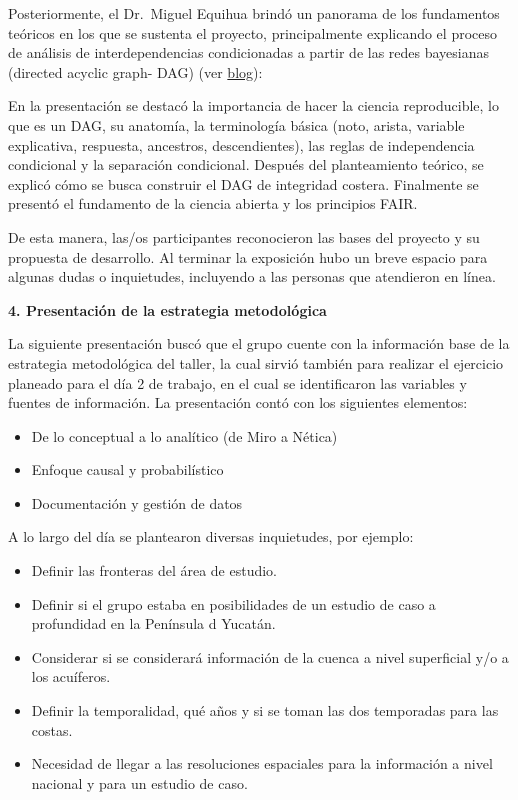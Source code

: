 \documentclass[
  letterpaper,
  DIV=11,
  numbers=noendperiod]{scrreprt}
\begin{document}
Posteriormente, el Dr.~Miguel Equihua brindó un panorama de los
fundamentos teóricos en los que se sustenta el proyecto, principalmente
explicando el proceso de análisis de interdependencias condicionadas a
partir de las redes bayesianas (directed acyclic graph- DAG) (ver
\href{https://sw-costas-arenosas.netlify.app/presentaciones\#category=presentaci\%C3\%B3n}{blog}):

En la presentación se destacó la importancia de hacer la ciencia
reproducible, lo que es un DAG, su anatomía, la terminología básica
(noto, arista, variable explicativa, respuesta, ancestros,
descendientes), las reglas de independencia condicional y la separación
condicional. Después del planteamiento teórico, se explicó cómo se busca
construir el DAG de integridad costera. Finalmente se presentó el
fundamento de la ciencia abierta y los principios FAIR.

De esta manera, las/os participantes reconocieron las bases del proyecto
y su propuesta de desarrollo. Al terminar la exposición hubo un breve
espacio para algunas dudas o inquietudes, incluyendo a las personas que
atendieron en línea.

\textbf{4. Presentación de la estrategia metodológica}

La siguiente presentación buscó que el grupo cuente con la información
base de la estrategia metodológica del taller, la cual sirvió también
para realizar el ejercicio planeado para el día 2 de trabajo, en el cual
se identificaron las variables y fuentes de información. La presentación
contó con los siguientes elementos:

\begin{itemize}
\item
  De lo conceptual a lo analítico (de Miro a Nética)
\item
  Enfoque causal y probabilístico
\item
  Documentación y gestión de datos
\end{itemize}

A lo largo del día se plantearon diversas inquietudes, por ejemplo:

\begin{itemize}
\item
  Definir las fronteras del área de estudio.
\item
  Definir si el grupo estaba en posibilidades de un estudio de caso a
  profundidad en la Península d Yucatán.
\item
  Considerar si se considerará información de la cuenca a nivel
  superficial y/o a los acuíferos.
\item
  Definir la temporalidad, qué años y si se toman las dos temporadas
  para las costas.
\item
  Necesidad de llegar a las resoluciones espaciales para la información
  a nivel nacional y para un estudio de caso.
\end{itemize}
\end{document}
